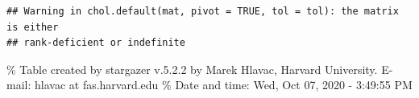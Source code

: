 \documentclass[
]{article}
\newenvironment{Shaded}{\begin{snugshade}}{\end{snugshade}}
\newcommand{\DataTypeTok}[1]{\textcolor[rgb]{0.13,0.29,0.53}{#1}}
\newcommand{\KeywordTok}[1]{\textcolor[rgb]{0.13,0.29,0.53}{\textbf{#1}}}
\newcommand{\NormalTok}[1]{#1}
\newcommand{\OperatorTok}[1]{\textcolor[rgb]{0.81,0.36,0.00}{\textbf{#1}}}
\newcommand{\StringTok}[1]{\textcolor[rgb]{0.31,0.60,0.02}{#1}}
\begin{document}
\begin{verbatim}
## Warning in chol.default(mat, pivot = TRUE, tol = tol): the matrix is either
## rank-deficient or indefinite
\end{verbatim}

\begin{Shaded}
\end{Shaded}

\% Table created by stargazer v.5.2.2 by Marek Hlavac, Harvard
University. E-mail: hlavac at fas.harvard.edu \% Date and time: Wed, Oct
07, 2020 - 3:49:55 PM
\end{document}
